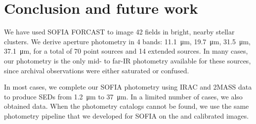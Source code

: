 %
%
%



\section{Conclusion and future work}

We have used SOFIA FORCAST to image 42 fields in bright, nearby stellar clusters. We derive aperture photometry in 4 bands: \SI{11.1}{\um}, \SI{19.7}{\um}, \SI{31.5}{\um}, \SI{37.1}{\um}, for a total of 70 point sources and 14 extended sources. In many cases, our photometry is the only mid- to far-IR photometry available for these sources, since archival \Spitzer observations were either saturated or confused.

In most cases, we complete our SOFIA photometry using \Spitzer IRAC and 2MASS data to produce SEDs from \SI{1.2}{\um} to \SI{37}{\um}. In a limited number of cases, we also obtained \Herschel data. When the photometry catalogs cannot be found, we use the same photometry pipeline that we developed for SOFIA on the \Spitzer and \Herschel calibrated images.

